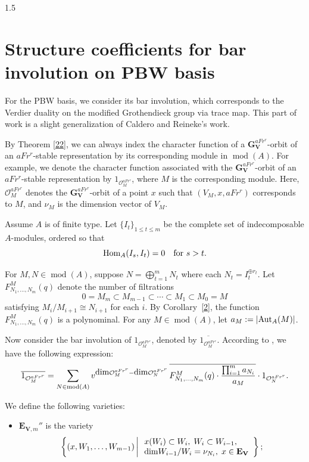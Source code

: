 \documentclass[10pt]{amsart}
\def\Hom{\mbox{\rm Hom}}  \def\ap{\mbox{\rm ap}}
\def\dim{\mbox{\rm dim}}   \def\End{\mbox{\rm End}}
\def\Aut{\mbox{\rm Aut}}   \def\Coker{\mbox{\rm Coker}\,}
\def\bfV{{\mathbf V}}
\def\bfV{\mathbf{V}}
\def\bfE{\mathbf{E}}
\def\bfG{\mathbf{G}}
\newcommand\mo{{\mathcal{O}}}
\begin{document}
\begin{spacing}{1.5}
\section{Structure coefficients for bar involution on PBW basis}
For the PBW basis, we consider its bar involution, which corresponds to the Verdier duality on the modified Grothendieck group via trace map. This part of work is a slight generalization of Caldero and Reineke's work\cite{2004The}. 

By Theorem \ref{22}, we can always index the character function of a $\bfG_{\bfV}^{aFr^r}$-orbit of an $aFr^r$-stable representation by its corresponding module in $\operatorname{mod}(A)$. For example, we denote the character function associated with the $\bfG_{\bfV}^{aFr^r}$-orbit of an $aFr^r$-stable representation by $1_{\mo^{aFr^r}_M}$, where $M$ is the corresponding module. Here, $\mo^{aFr^r}_M$ denotes the $\bfG_{\bfV}^{aFr^r}$-orbit of a point $x$ such that $(V_M, x, aFr^r)$ corresponds to $M$, and $\nu_M$ is the dimension vector of $V_M$.

Assume $A$ is of finite type. Let $\{I_t\}_{1 \leq t \leq m}$ be the complete set of indecomposable $A$-modules, ordered so that
\[
\Hom_A(I_s, I_t) = 0 \quad \text{for } s > t.
\]

For $M, N \in \operatorname{mod}(A)$, suppose $N = \bigoplus_{t=1}^m N_t$ where each $N_t = I_t^{\oplus r_t}$. Let $F_{N_1, \dots, N_m}^M(q)$ denote the number of filtrations
\[
0 = M_m \subset M_{m-1} \subset \cdots \subset M_1 \subset M_0 = M
\]
satisfying $M_i / M_{i+1} \cong N_{i+1}$ for each $i$. By Corollary~\ref{2}, the function $F_{N_1, \dots, N_m}^M(q)$ is a polynominal. For any $M \in \operatorname{mod}(A)$, let $a_M := |\Aut_A(M)|$.

Now consider the bar involution of $1_{\mo^{aFr^r}_M}$, denoted by $\overline{1_{\mo^{aFr^r}_M}}$. According to \cite[Proposition 3.3]{2004The}, we have the following expression:
\begin{equation} \label{gs}
\overline{1_{\mo^{aFr^r}_M}} = \sum_{N \in \operatorname{mod}(A)} v^{\dim \mo^{aFr^r}_M - \dim \mo^{aFr^r}_N} \, \overline{F_{N_1, \dots, N_m}^M(q) \cdot \frac{\prod_{i=1}^m a_{N_i}}{a_M}} \cdot 1_{\mo^{aFr^r}_N}.
\end{equation}

We define the following varieties:
\begin{itemize}
    \item $\bfE_{\bfV,m}''$ is the variety
    \[
    \left\{ (x, W_1, \dots, W_{m-1}) \,\middle|\, 
    \begin{array}{l}
    x(W_i) \subset W_i, \; W_i \subset W_{i-1}, \\
    \dim W_{i-1} / W_i = \nu_{N_i}, \; x \in \bfE_{\bfV}
    \end{array}
    \right\};
    \]
    

\end{itemize}
\end{spacing}
\end{document}

